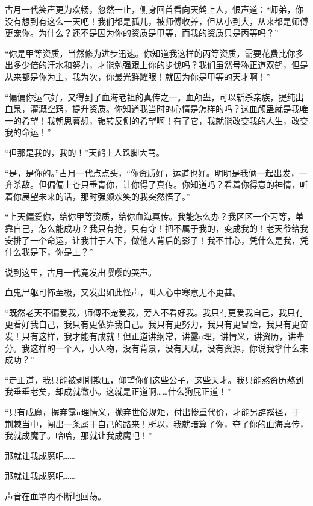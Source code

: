 
\begin{this_body}

古月一代笑声更为欢畅，忽然一止，侧身回首看向天鹤上人，恨声道：“师弟，你没有想到有这么一天吧！我们都是孤儿，被师傅收养，但从小到大，从来都是师傅更宠你。为什么？还不是因为你的资质是甲等，而我的资质只是丙等吗？”

“你是甲等资质，当然修为进步迅速。你知道我这样的丙等资质，需要花费比你多出多少倍的汗水和努力，才能勉强跟上你的步伐吗？我们虽然号称正道双鹤，但是从来都是你为主，我为次，你最光鲜耀眼！就因为你是甲等的天才啊！”

“偏偏你运气好，又得到了血海老祖的真传之一。血颅蛊，可以斩杀亲族，提纯出血泉，灌溉空窍，提升资质。你知道我当时的心情是怎样的吗？这血颅蛊就是我唯一的希望！我朝思暮想，辗转反侧的希望啊！有了它，我就能改变我的人生，改变我的命运！”

“但那是我的，我的！”天鹤上人跺脚大骂。

“是，是你的。”古月一代点点头，“你资质好，运道也好。明明是我俩一起出发，一齐杀敌。但偏偏上苍只垂青你，让你得了真传。你知道吗？看着你得意的神情，听着你展望未来的话，那时强颜欢笑的我突然悟了。”

“上天偏爱你，给你甲等资质，给你血海真传。我能怎么办？我区区一个丙等，单靠自己，怎么能成功？我只有抢，只有夺！把不属于我的，变成我的！老天爷给我安排了一个命运，让我甘于人下，做他人背后的影子！我不甘心，凭什么是我，凭什么我是下，你是上？”

说到这里，古月一代竟发出嘤嘤的哭声。

血鬼尸躯可怖至极，又发出如此怪声，叫人心中寒意无不更甚。

“既然老天不偏爱我，师傅不宠爱我，旁人不看好我。我只有更爱我自己，我只有更看好我自己，我只有更依靠我自己。我只有更努力，我只有更冒险，我只有更奋发！只有这样，我才能有成就！但正道讲纲常，讲露n理，讲情义，讲资历，讲辈分。我这样的一个人，小人物，没有背景，没有天赋，没有资源，你说我拿什么来成功？”

“走正道，我只能被剥削欺压，仰望你们这些公子，这些天才。我只能熬资历熬到我垂垂老矣，却成就微小。这就是正道啊……什么狗屁正道！”

“只有成魔，摒弃露n理情义，抛弃世俗规矩，付出惨重代价，才能另辟蹊径，于荆棘当中，闯出一条属于自己的路来！所以，我就暗算了你，夺了你的血海真传，我就成魔了。哈哈，那就让我成魔吧！”

那就让我成魔吧……

那就让我成魔吧……

声音在血罩内不断地回荡。


\end{this_body}
